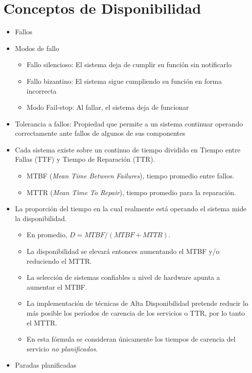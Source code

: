 \section{Conceptos de Disponibilidad}
\begin{itemize}
	\item Fallos
	\item Modos de fallo
	\begin{itemize}
		\item Fallo silencioso: El sistema deja de cumplir su función sin notificarlo
		\item Fallo bizantino: El sistema sigue cumpliendo su función en forma incorrecta
		\item Modo Fail-stop: Al fallar, el sistema deja de funcionar
	\end{itemize}
	\item Tolerancia a fallos: Propiedad que permite a un sistema continuar operando correctamente ante fallos de algunos de sus componentes	
	\item Cada sistema existe sobre un continuo de tiempo dividido en Tiempo entre Fallas (TTF) y Tiempo de Reparación (TTR). 
	\begin{itemize}
		\item MTBF (\textit{Mean Time Between Failures}), tiempo promedio entre fallos.
		\item MTTR (\textit{Mean Time To Repair}), tiempo promedio para la reparación.
	\end{itemize}
	\item La proporción del tiempo en la cual realmente está operando el sistema mide la disponibilidad. 
	\begin{itemize}
		\item En promedio, $D = MTBF / (MTBF + MTTR)$.
		\item La disponibilidad se elevará entonces aumentando el MTBF y/o reduciendo el MTTR. 
		\item La selección de sistemas confiables a nivel de hardware apunta a aumentar el MTBF. 
		\item La implementación de técnicas de Alta Disponibilidad pretende reducir lo más posible los períodos de carencia de los servicios o TTR, por lo tanto el MTTR. 
		\item En esta fórmula se consideran únicamente los tiempos de carencia del servicio \textit{no planificados}.
	\end{itemize}
	\item Paradas planificadas
	\begin{itemize}		

\end{itemize}
\end{itemize}
